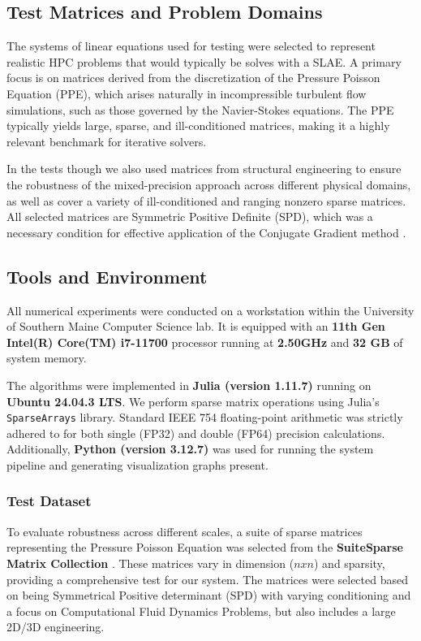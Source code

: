 \documentclass[a4paper,10.5pt,twoside]{article}
\begin{document}
\subsection{Test Matrices and Problem Domains}

The systems of linear equations used for testing were selected to represent realistic HPC problems that would typically be solves with a SLAE. A primary focus is on matrices derived from the discretization of the Pressure Poisson Equation (PPE), which arises naturally in incompressible turbulent flow simulations, such as those governed by the Navier-Stokes equations. The PPE typically yields large, sparse, and ill-conditioned matrices, making it a highly relevant benchmark for iterative solvers.

In the tests though we also used matrices from structural engineering to ensure the robustness of the mixed-precision approach across different physical domains, as well as cover a variety of ill-conditioned and ranging nonzero sparse matrices. All selected matrices are Symmetric Positive Definite (SPD), which was a necessary condition for effective application of the Conjugate Gradient method \autocite{hestenes1952methods}. 

\subsection{Tools and Environment}

All numerical experiments were conducted on a workstation within the University of Southern Maine Computer Science lab. It is equipped with an \textbf{11th Gen Intel(R) Core(TM) i7-11700} processor running at \textbf{2.50GHz} and \textbf{32 GB} of system memory. 

The algorithms were implemented in \textbf{Julia (version 1.11.7)} running on \textbf{Ubuntu 24.04.3 LTS}. We perform sparse matrix operations using Julia's \texttt{SparseArrays} library. Standard IEEE 754 floating-point arithmetic was strictly adhered to for both single (FP32) and double (FP64) precision calculations. Additionally, \textbf{Python (version 3.12.7)} was used for running the system pipeline and generating visualization graphs present.

\subsubsection{Test Dataset}
To evaluate robustness across different scales, a suite of sparse matrices representing the Pressure Poisson Equation was selected from the \textbf{SuiteSparse Matrix Collection} \autocite{Davis_2011}. These matrices vary in dimension ($nxn$) and sparsity, providing a comprehensive test for our system. The matrices were selected based on being Symmetrical Positive determinant (SPD) with varying conditioning and a focus on Computational Fluid Dynamics Problems, but also includes a large 2D/3D engineering.
\end{document}
